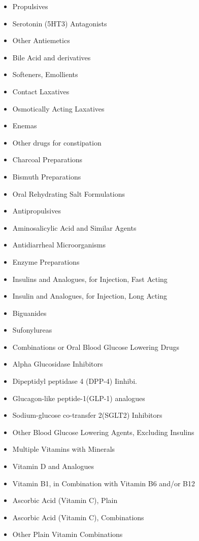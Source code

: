 \documentclass[a4paper,12pt]{article}
\begin{document}
\begin{appendices}
\begin{itemize}
   			\item Propulsives
   			\item Serotonin (5HT3) Antagonists
   			\item Other Antiemetics
   			\item Bile Acid and derivatives
   			\item Softeners, Emollients
   			\item Contact Laxatives
   			\item Osmotically Acting Laxatives
   			\item Enemas
   			\item Other drugs for constipation
   			\item Charcoal Preparations
   			\item Bismuth Preparations
   			\item Oral Rehydrating Salt Formulations
   			\item Antipropulsives
   			\item Aminosalicylic Acid and Similar Agents
   			\item Antidiarrheal Microorganisms
   			\item Enzyme Preparations
   			\item Insulins and Analogues, for Injection, Fast Acting
   			\item Insulin and Analogues, for Injection, Long Acting
   			\item Biguanides
   			\item Sufonylureas
   			\item Combinations or Oral Blood Glucose Lowering Drugs
   			\item Alpha Glucosidase Inhibitors
   			\item Dipeptidyl peptidase 4 (DPP-4) Iinhibi.
   			\item Glucagon-like peptide-1(GLP-1) analogues
   			\item Sodium-glucose co-transfer 2(SGLT2) Inhibitors
   			\item Other Blood Glucose Lowering Agents, Excluding Insulins
   			\item Multiple Vitamins with Minerals
   			\item Vitamin D and Analogues
   			\item Vitamin B1, in Combination with Vitamin B6 and/or B12
   			\item Ascorbic Acid (Vitamin C), Plain
   			\item Ascorbic Acid (Vitamin C), Combinations
   			\item Other Plain Vitamin Combinations

\end{itemize}
\end{appendices}
\end{document}
